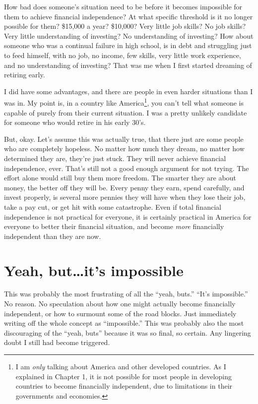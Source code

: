 How bad does someone's situation need to be before it becomes impossible for them to achieve financial independence? At what specific threshold is it no longer possible for them? \$15,000 a year? \$10,000? Very little job skills? No job skills? Very little understanding of investing? No understanding of investing? How about someone who was a continual failure in high school, is in debt and struggling just to feed himself, with no job, no income, few skills, very little work experience, and no understanding of investing? That was me when I first started dreaming of retiring early.

I did have some advantages, and there are people in even harder situations than I was in. My point is, in a country like America\footnote{I am \emph{only} talking about America and other developed countries. As I explained in Chapter 1, it is not possible for most people in developing countries to become financially independent, due to limitations in their governments and economies.}, you can't tell what someone is capable of purely from their current situation. I was a pretty unlikely candidate for someone who would retire in his early 30's.

But, okay. Let's assume this was actually true, that there just are some people who are completely hopeless. No matter how much they dream, no matter how determined they are, they're just stuck. They will never achieve financial independence, ever. That's still not a good enough argument for not trying. The effort alone would still buy them more freedom. The smarter they are about money, the better off they will be. Every penny they earn, spend carefully, and invest properly, is several more pennies they will have when they lose their job, take a pay cut, or get hit with some catastrophe. Even if total financial independence is not practical for everyone, it is certainly practical in America for everyone to better their financial situation, and become \emph{more} financially independent than they are now.

\section{Yeah, but\ldots it's impossible}
This was probably the most frustrating of all the ``yeah, buts.'' ``It's impossible.'' No reason. No speculation about how one might actually become financially independent, or how to surmount some of the road blocks. Just immediately writing off the whole concept as ``impossible.'' This was probably also the most discouraging of the ``yeah, buts'' because it was so final, so certain. Any lingering doubt I still had become triggered.

